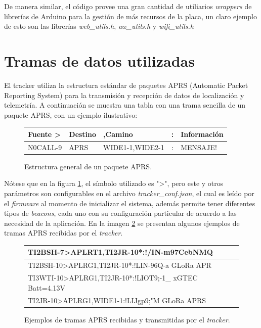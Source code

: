 \documentclass[journal]{IEEEtran}
\begin{document}
De manera similar, el código provee una gran cantidad de utiliarios \textit{wrappers} de librerías de Arduino para la gestión de más recursos de la placa, un claro ejemplo de esto son las librerías \textit{web\_utils.h}, \textit{wx\_utils.h} y \textit{wifi\_utils.h}

\section{Tramas de datos utilizadas}

El tracker utiliza la estructura estándar de paquetes APRS (Automatic Packet Reporting System) para la transmisión y recepción de datos de localización y telemetría. A continuación se muestra una tabla con una trama sencilla de un paquete APRS, con un ejemplo ilustrativo:

\small

\vspace{0.5em}
\begin{figure}[h!]
\begin{tabular}{@{} l l l c l @{}}
\toprule
\textbf{Fuente} \textbf{>}& \textbf{Destino} & \textbf{,}\textbf{Camino} & \textbf{:} & \textbf{Información}\\
\midrule
N0CALL-9 & APRS & WIDE1-1,WIDE2-1 & : & MENSAJE! \\
\bottomrule
\end{tabular}
\caption{Estructura general de un paquete APRS.}
\label{fig:trama-aprs}
\end{figure}

Nótese que en la figura \ref{fig:trama-aprs}, el símbolo utilizado es ">", pero este y otros parámetros son configurables en el archivo \textit{tracker\_conf.json}, el cual es leído por el \textit{firmware} al momento de inicializar el sistema, además permite tener diferentes tipos de \textit{beacons}, cada uno con su configuración particular de acuerdo a las necesidad de la aplicación.
En la imagen \ref{fig:tramas-ejemplo} se presentan algunos ejemplos de tramas APRS recibidas por el \textit{tracker}.

\begin{figure}[htbp]
\begin{tabular}{|l|}
\hline
TI2BSH-7>APLRT1,TI2JR-10*:!/IN-m97CebNMQ\\
\hline
TI2BSH-10>APLRG1,TI2JR-10*:!LIN-96Q-a  GLoRa APR\\
\hline
TI3WTI-10>APLRG1,TI2JR-10*:!LIOT9;-1\_ xGTEC Batt=4.13V \\
\hline
TI2JR-10>APLRG1,WIDE1-1:!LIJgp9;"M  GLoRa APRS \\
\hline
\end{tabular}
\caption{Ejemplos de tramas APRS recibidas y transmitidas por el \textit{tracker}.}
\label{fig:tramas-ejemplo}
\end{figure}
\vspace{1cm}
\end{document}

